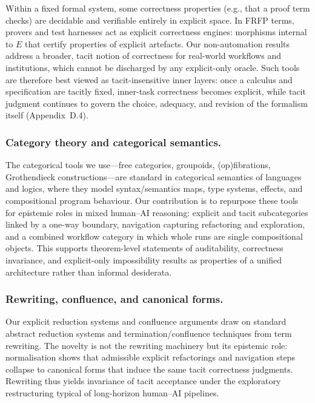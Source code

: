 \documentclass[preprints,accept]{Definitions/mdpi}
\theoremstyle{definition}
\begin{document}
Within a fixed formal system, some correctness properties (e.g., that a proof term checks) are decidable and verifiable entirely in explicit space. In FRFP terms, provers and test harnesses act as explicit correctness engines: morphisms internal to $E$ that certify properties of explicit artefacts. Our non-automation results address a broader, tacit notion of correctness for real-world workflows and institutions, which cannot be discharged by any explicit-only oracle. Such tools are therefore best viewed as tacit-insensitive inner layers: once a calculus and specification are tacitly fixed, inner-task correctness becomes explicit, while tacit judgment continues to govern the choice, adequacy, and revision of the formalism itself (Appendix~D.4).

\subsubsection{Category theory and categorical semantics.}
The categorical tools we use---free categories, groupoids, (op)fibrations, Grothendieck constructions---are standard in categorical semantics of languages and logics, where they model syntax/semantics maps, type systems, effects, and compositional program behaviour. Our contribution is to repurpose these tools for epistemic roles in mixed human--AI reasoning: explicit and tacit subcategories linked by a one-way boundary, navigation capturing refactoring and exploration, and a combined workflow category in which whole runs are single compositional objects. This supports theorem-level statements of auditability, correctness invariance, and explicit-only impossibility results as properties of a unified architecture rather than informal desiderata.

\subsubsection{Rewriting, confluence, and canonical forms.}
Our explicit reduction systems and confluence arguments draw on standard abstract reduction systems and termination/confluence techniques from term rewriting. The novelty is not the rewriting machinery but its epistemic role: normalisation shows that admissible explicit refactorings and navigation steps collapse to canonical forms that induce the same tacit correctness judgments. Rewriting thus yields invariance of tacit acceptance under the exploratory restructuring typical of long-horizon human--AI pipelines.
\end{document}
